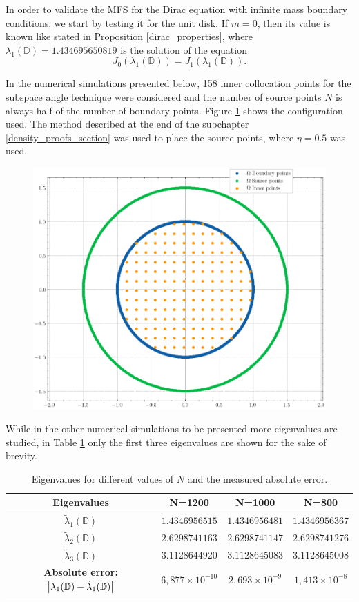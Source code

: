 In order to validate the MFS for the Dirac equation with infinite mass boundary conditions, we start by testing it for the unit disk. If \(m=0\), then its value is known like stated in Proposition \ref{dirac_properties}, where \(\lambda_1(\mathbb{D})= 1.434695650819\) is the solution of the equation
\[
    J_0(\lambda_1(\mathbb{D})) = J_1(\lambda_1(\mathbb{D})).
\]

In the numerical simulations presented below, 158 inner collocation points for the subspace angle technique were considered and the number of source points \(N\) is always half of the number of boundary points. Figure \ref{dirak_disk_col_m0} shows the configuration used. The method described at the end of the subchapter \ref{density_proofs_section} was used to place the source points, where \(\eta=0.5\) was used. 

\begin{figure}[!htb]
    \centering
    \includegraphics[width=0.5\linewidth]{Images/Dirac/circle_m_0_col_points_158_inner_eta_05.png}
    \label{dirak_disk_col_m0}
\end{figure}

While in the other numerical simulations to be presented more eigenvalues are studied, in Table \ref{tab:eigenvalues_disk_val} only the first three eigenvalues are shown for the sake of brevity.

\begin{table}[htbp]
    \centering
    \begin{tabular}{cccc}
        \toprule
        \textbf{Eigenvalues} & \textbf{N=1200} & \textbf{N=1000} & \textbf{N=800} \\
        \midrule
        \(\tilde{\lambda}_1(\mathbb{D})\) & $1.4346956515$ & $1.4346956481$ & $1.4346956367$ \\
        \(\tilde{\lambda}_2(\mathbb{D})\) & $2.6298741163$ & $2.6298741147$ & $2.6298741276$ \\
        \(\tilde{\lambda}_3(\mathbb{D})\) & $3.1128644920$ & $3.1128645083$ & $3.1128645008$ \\
        \midrule
        \textbf{Absolute error: } \(\abs{\lambda_1(\mathbb{D}) - \tilde{\lambda}_1(\mathbb{D})}\) & $6,877\times 10^{-10}$ & $2,693\times 10^{-9}$ & $1,413\times 10^{-8}$ \\
        \bottomrule
    \end{tabular}
    \caption{Eigenvalues for different values of \(N\) and the measured absolute error.}
    \label{tab:eigenvalues_disk_val}
\end{table}

